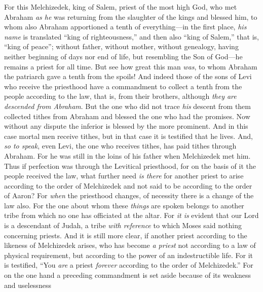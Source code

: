 \begin{biblechapter} %
 For this Melchizedek, king of Salem, priest of the most high God, who met Abraham \textit{as he} was returning from the slaughter of the kings and blessed him,
\verse to whom also Abraham apportioned a tenth of everything—in the first place, \textit{his name} is translated “king of righteousness,” and then also “king of Salem,” that is, “king of peace”;
\verse without father, without mother, without genealogy, having neither beginning of days nor end of life, but resembling the Son of God—he remains a priest for all time.
\verse But see how great this man \textit{was}, to whom Abraham the patriarch gave a tenth from the spoils!
\verse And indeed those of the sons of Levi who receive the priesthood have a commandment to collect a tenth from the people according to the law, that is, from their brothers, although \textit{they are descended from Abraham}.
\verse But the one who did not trace \textit{his} descent from them collected tithes from Abraham and blessed the one who had the promises.
\verse Now without any dispute the inferior is blessed by the more prominent.
\verse And in this case mortal men receive tithes, but in that case it is testified that he lives.
\verse And, \textit{so to speak}, even Levi, the one who receives tithes, has paid tithes through Abraham.
\verse For he was still in the loins of his father when Melchizedek met him.
 Thus if perfection was through the Levitical priesthood, for on the basis of it the people received the law, what further need \textit{is there} for another priest to arise according to the order of Melchizedek and not said to be according to the order of Aaron?
\verse For \textit{when} the priesthood changes, of necessity there is a change of the law also.
\verse For the one about whom these \textit{things} are spoken belongs to another tribe from which no one has officiated at the altar.
\verse For \textit{it is} evident that our Lord is a descendant of Judah, a tribe \textit{with reference} to which Moses said nothing concerning priests.
\verse And it is still more clear, if another priest according to the likeness of Melchizedek arises,
\verse who has become \textit{a priest} not according to a law of physical requirement, but according to the power of an indestructible life.
\verse For it is testified, “You \textit{are} a priest \textit{forever} according to the order of Melchizedek.”
\verse For on the one hand a preceding commandment is set aside because of its weakness and uselessness

\end{biblechapter}
